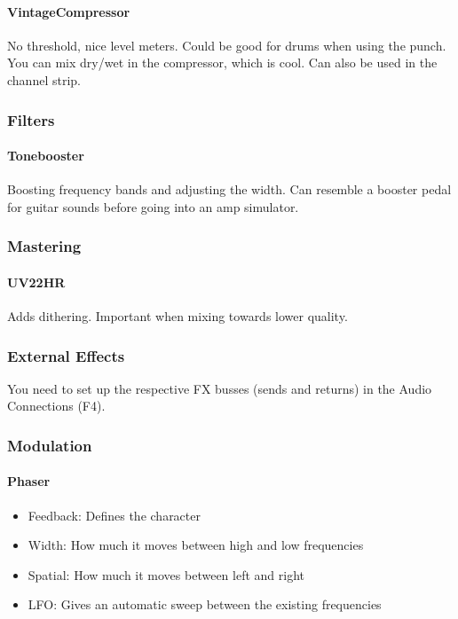 \documentclass[10pt]{article}
\begin{document}
\paragraph{VintageCompressor}

No threshold, nice level meters. Could be good for drums when using the punch. You can mix dry/wet in the compressor, which is cool. Can also be used in the channel strip.

\subsubsection{Filters}

\paragraph{Tonebooster}

Boosting frequency bands and adjusting the width. Can resemble a booster pedal for guitar sounds before going into an amp simulator.

\subsubsection{Mastering}

\paragraph{UV22HR}\hypertarget{UV-22HR}{}

Adds dithering. Important when mixing towards lower quality.

\subsubsection{External Effects} You need to set up the respective FX busses (sends and returns) in the Audio Connections (F4).

\subsubsection{Modulation}

\paragraph{Phaser}

\begin{itemize}
	\item Feedback: Defines the character
	\item Width: How much it moves between high and low frequencies
	\item Spatial: How much it moves between left and right
	\item LFO: Gives an automatic sweep between the existing frequencies
\end{itemize}
\end{document}
